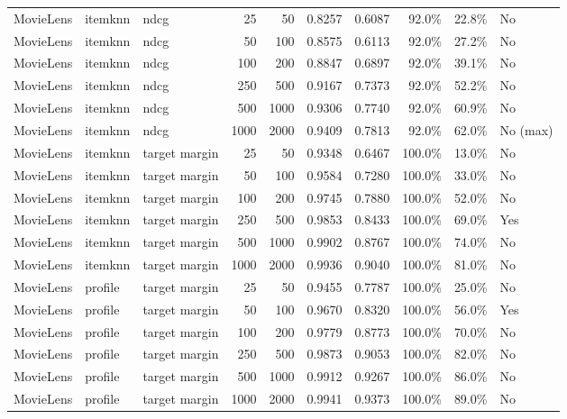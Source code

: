 \begin{longtable}{@{}p{}p{}p{}rrrrrrp{}@{}}
MovieLens & itemknn & ndcg & 25 & 50 & 0.8257 & 0.6087 & 92.0\% & 22.8\% & No \\
MovieLens & itemknn & ndcg & 50 & 100 & 0.8575 & 0.6113 & 92.0\% & 27.2\% & No \\
MovieLens & itemknn & ndcg & 100 & 200 & 0.8847 & 0.6897 & 92.0\% & 39.1\% & No \\
MovieLens & itemknn & ndcg & 250 & 500 & 0.9167 & 0.7373 & 92.0\% & 52.2\% & No \\
MovieLens & itemknn & ndcg & 500 & 1000 & 0.9306 & 0.7740 & 92.0\% & 60.9\% & No \\
MovieLens & itemknn & ndcg & 1000 & 2000 & 0.9409 & 0.7813 & 92.0\% & 62.0\% & No (max) \\
MovieLens & itemknn & target margin & 25 & 50 & 0.9348 & 0.6467 & 100.0\% & 13.0\% & No \\
MovieLens & itemknn & target margin & 50 & 100 & 0.9584 & 0.7280 & 100.0\% & 33.0\% & No \\
MovieLens & itemknn & target margin & 100 & 200 & 0.9745 & 0.7880 & 100.0\% & 52.0\% & No \\
MovieLens & itemknn & target margin & 250 & 500 & 0.9853 & 0.8433 & 100.0\% & 69.0\% & Yes \\
MovieLens & itemknn & target margin & 500 & 1000 & 0.9902 & 0.8767 & 100.0\% & 74.0\% & No \\
MovieLens & itemknn & target margin & 1000 & 2000 & 0.9936 & 0.9040 & 100.0\% & 81.0\% & No \\
MovieLens & profile & target margin & 25 & 50 & 0.9455 & 0.7787 & 100.0\% & 25.0\% & No \\
MovieLens & profile & target margin & 50 & 100 & 0.9670 & 0.8320 & 100.0\% & 56.0\% & Yes \\
MovieLens & profile & target margin & 100 & 200 & 0.9779 & 0.8773 & 100.0\% & 70.0\% & No \\
MovieLens & profile & target margin & 250 & 500 & 0.9873 & 0.9053 & 100.0\% & 82.0\% & No \\
MovieLens & profile & target margin & 500 & 1000 & 0.9912 & 0.9267 & 100.0\% & 86.0\% & No \\
MovieLens & profile & target margin & 1000 & 2000 & 0.9941 & 0.9373 & 100.0\% & 89.0\% & No \\
\end{longtable}